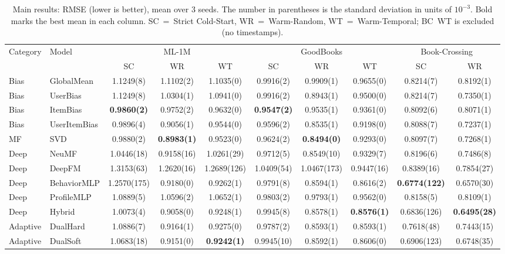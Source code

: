 \documentclass[journal]{IEEEtran}
\begin{document}
\begin{table}[!t]
\centering
\caption{Main results: RMSE (lower is better), mean over 3 seeds. The number in parentheses is the standard deviation in units of $10^{-3}$. Bold marks the best mean in each column. SC~=~Strict Cold-Start, WR~=~Warm-Random, WT~=~Warm-Temporal; BC~WT is excluded (no timestamps).}
\label{tab:main_results}
\footnotesize
\begin{tabular}{@{}ll cccccccc@{}}
\toprule
\multirow{2}{*}{Category} & \multirow{2}{*}{Model} & \multicolumn{3}{c}{ML-1M} & \multicolumn{3}{c}{GoodBooks} & \multicolumn{2}{c}{Book-Crossing} \\
\cmidrule(lr){3-5} \cmidrule(lr){6-8} \cmidrule(lr){9-10}
 & & SC & WR & WT & SC & WR & WT & SC & WR \\
\midrule
Bias & GlobalMean    & 1.1249(8) & 1.1102(2) & 1.1035(0) & 0.9916(2) & 0.9909(1) & 0.9655(0) & 0.8214(7) & 0.8192(1) \\
Bias & UserBias      & 1.1249(8) & 1.0304(1) & 1.0941(0) & 0.9916(2) & 0.8943(1) & 0.9500(0) & 0.8214(7) & 0.7350(1) \\
Bias & ItemBias      & \textbf{0.9860(2)} & 0.9752(2) & 0.9632(0) & \textbf{0.9547(2)} & 0.9535(1) & 0.9361(0) & 0.8092(6) & 0.8071(1) \\
Bias & UserItemBias  & 0.9896(4) & 0.9056(1) & 0.9544(0) & 0.9596(2) & 0.8535(1) & 0.9198(0) & 0.8088(7) & 0.7237(1) \\
\midrule
MF & SVD            & 0.9880(2) & \textbf{0.8983(1)} & 0.9523(0) & 0.9624(2) & \textbf{0.8494(0)} & 0.9293(0) & 0.8097(7) & 0.7268(1) \\
\midrule
Deep & NeuMF         & 1.0446(18) & 0.9158(16) & 1.0261(29) & 0.9712(5) & 0.8549(10) & 0.9329(7) & 0.8196(6) & 0.7486(8) \\
Deep & DeepFM        & 1.3153(63) & 1.2620(16) & 1.2689(126) & 1.0409(54) & 1.0467(173) & 0.9447(16) & 0.8389(16) & 0.7854(27) \\
Deep & BehaviorMLP   & 1.2570(175) & 0.9180(0) & 0.9262(1) & 0.9791(8) & 0.8594(1) & 0.8616(2) & \textbf{0.6774(122)} & 0.6570(30) \\
Deep & ProfileMLP    & 1.0889(5) & 1.0596(2) & 1.0652(1) & 0.9803(2) & 0.9793(1) & 0.9562(0) & 0.8158(5) & 0.8109(1) \\
Deep & Hybrid        & 1.0073(4) & 0.9058(0) & 0.9248(1) & 0.9945(8) & 0.8578(1) & \textbf{0.8576(1)} & 0.6836(126) & \textbf{0.6495(28)} \\
\midrule
Adaptive & DualHard  & 1.0886(7) & 0.9164(1) & 0.9275(0) & 0.9787(2) & 0.8593(1) & 0.8593(1) & 0.7618(48) & 0.7443(15) \\
Adaptive & DualSoft  & 1.0683(18) & 0.9151(0) & \textbf{0.9242(1)} & 0.9945(10) & 0.8592(1) & 0.8606(0) & 0.6906(123) & 0.6748(35) \\
\bottomrule
\end{tabular}
\end{table}
\end{document}
